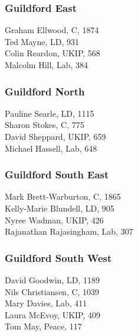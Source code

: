 \documentclass[a4paper,openany,10pt]{book}
\begin{document}
\subsubsection*{Guildford East}



Graham Ellwood, C, 1874\\
Ted Mayne, LD, 931\\
Colin Reardon, UKIP, 568\\
Malcolm Hill, Lab, 384\\


\subsubsection*{Guildford North}



Pauline Searle, LD, 1115\\
Sharon Stokes, C, 775\\
David Sheppard, UKIP, 659\\
Michael Hassell, Lab, 648\\


\subsubsection*{Guildford South East}



{Mark Brett-Warburton}, C, 1865\\
Kelly-Marie Blundell, LD, 905\\
Nyree Wadman, UKIP, 426\\
Rajanathan Rajasingham, Lab, 307\\


\subsubsection*{Guildford South West}



David Goodwin, LD, 1189\\
Nils Christiansen, C, 1039\\
Mary Davies, Lab, 411\\
Laura McEvoy, UKIP, 409\\
Tom May, Peace, 117\\
\end{document}
